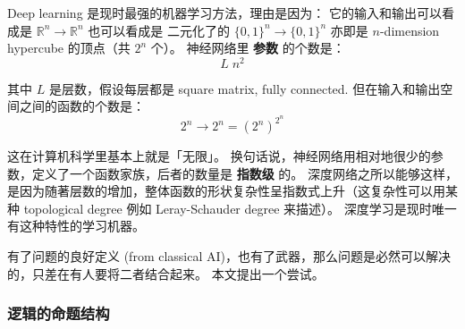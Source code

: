 \documentclass[orivec]{article}
\newcommand{\cc}[2]{#1}
\newcommand{\cc}[2]{#2}
\begin{document}
\cc{
Deep learning 是现时最强的机器学习方法，理由是因为： 它的输入和输出可以看成是 $\mathbb{R}^n \rightarrow \mathbb{R}^n$ 也可以看成是 二元化了的 $\{0,1\}^n \rightarrow \{0,1\}^n$ 亦即是 $n$-dimension hypercube 的顶点（共 $2^n$ 个）。  神经网络里 \textbf{参数} 的个数是：}{
Deep learning is the most powerful machine learning technique nowadays.  Its strength lies in the fact that a deep neural network can realize a huge family of functions using a relatively small number of parameters.  Assume that the network maps from $\mathbb{R}^n \rightarrow \mathbb{R}^n$, or the binarized form $\{0,1\}^n \rightarrow \{0,1\}^n$, which are the vertices of the $n$-dimension \textbf{hypercube}.  The number of parameters in the neural network is:
}
\begin{equation}
L \; n^2 \nonumber
\end{equation}
\cc{
其中 $L$ 是层数，假设每层都是 square matrix, fully connected.  但在输入和输出空间之间的函数的个数是：}{
where $L$ = \#(layers), assuming every layer is a square matrix, fully connected.  Whereas, the number of functions that exists between the input and output spaces is:
}
\begin{equation}
2^n \rightarrow 2^n = {(2^n)}^{2^n}
\end{equation}
\cc{
这在计算机科学里基本上就是「无限」。  换句话说，神经网络用相对地很少的参数，定义了一个函数家族，后者的数量是 \textbf{指数级} 的。 深度网络之所以能够这样，是因为随著层数的增加，整体函数的形状复杂性呈指数式上升（这复杂性可以用某种 topological degree 例如  Leray-Schauder degree 来描述）。 深度学习是现时唯一有这种特性的学习机器。}{
This is essentially ``infinity'' in computer science.  The number of functions grows exponentially, but a deep neural network can handle them because, as the number of layers grows, the possible shapes of the network function also increases exponentially (the complexity of shapes can be measured by a ``topological degree'' such as the Leray-Schauder degree).  Deep learning is the only learning machine with this property.
}

\cc{
有了问题的良好定义 (from classical AI)，也有了武器，那么问题是必然可以解决的，只差在有人要将二者结合起来。  本文提出一个尝试。 }{
Now that we have a well-defined function, and we have the weapon, the problem's solution should not be far away.  Someone just needs to combine the two aspects.  Here we propose one such attempt.
}

\subsubsection{\cc{逻辑的命题结构}{The propositional structure in logic}}
\end{document}
